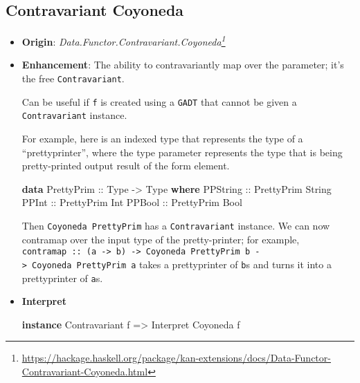 \documentclass[]{article}
\newenvironment{Shaded}{}{}
\newcommand{\DataTypeTok}[1]{\textcolor[rgb]{0.56,0.13,0.00}{#1}}
\newcommand{\KeywordTok}[1]{\textcolor[rgb]{0.00,0.44,0.13}{\textbf{#1}}}
\newcommand{\NormalTok}[1]{#1}
\newcommand{\OtherTok}[1]{\textcolor[rgb]{0.00,0.44,0.13}{#1}}
\renewcommand{\href}[2]{#2\footnote{\url{#1}}}
\begin{document}
\subsection{Contravariant Coyoneda}\label{contravariant-coyoneda}

\begin{itemize}
\item
  \textbf{Origin}:
  \emph{\href{https://hackage.haskell.org/package/kan-extensions/docs/Data-Functor-Contravariant-Coyoneda.html}{Data.Functor.Contravariant.Coyoneda}}
\item
  \textbf{Enhancement}: The ability to contravariantly map over the parameter;
  it's the free \texttt{Contravariant}.

  Can be useful if \texttt{f} is created using a \texttt{GADT} that cannot be
  given a \texttt{Contravariant} instance.

  For example, here is an indexed type that represents the type of a
  ``prettyprinter'', where the type parameter represents the type that is being
  pretty-printed output result of the form element.

\begin{Shaded}
\begin{Highlighting}[]
\KeywordTok{data} \DataTypeTok{PrettyPrim}\OtherTok{ ::} \DataTypeTok{Type} \OtherTok{{-}\textgreater{}} \DataTypeTok{Type} \KeywordTok{where}
    \DataTypeTok{PPString}\OtherTok{  ::} \DataTypeTok{PrettyPrim} \DataTypeTok{String}
    \DataTypeTok{PPInt}\OtherTok{     ::} \DataTypeTok{PrettyPrim} \DataTypeTok{Int}
    \DataTypeTok{PPBool}\OtherTok{    ::} \DataTypeTok{PrettyPrim} \DataTypeTok{Bool}
\end{Highlighting}
\end{Shaded}

  Then \texttt{Coyoneda\ PrettyPrim} has a \texttt{Contravariant} instance. We
  can now contramap over the input type of the pretty-printer; for example,
  \texttt{contramap\ ::\ (a\ -\textgreater{}\ b)\ -\textgreater{}\ Coyoneda\ PrettyPrim\ b\ -\textgreater{}\ Coyoneda\ PrettyPrim\ a}
  takes a prettyprinter of \texttt{b}s and turns it into a prettyprinter of
  \texttt{a}s.
\item
  \textbf{Interpret}

\begin{Shaded}
\begin{Highlighting}[]
\KeywordTok{instance} \DataTypeTok{Contravariant}\NormalTok{ f }\OtherTok{=\textgreater{}} \DataTypeTok{Interpret} \DataTypeTok{Coyoneda}\NormalTok{ f}


\end{Highlighting}
\end{Shaded}
\end{itemize}
\end{document}
